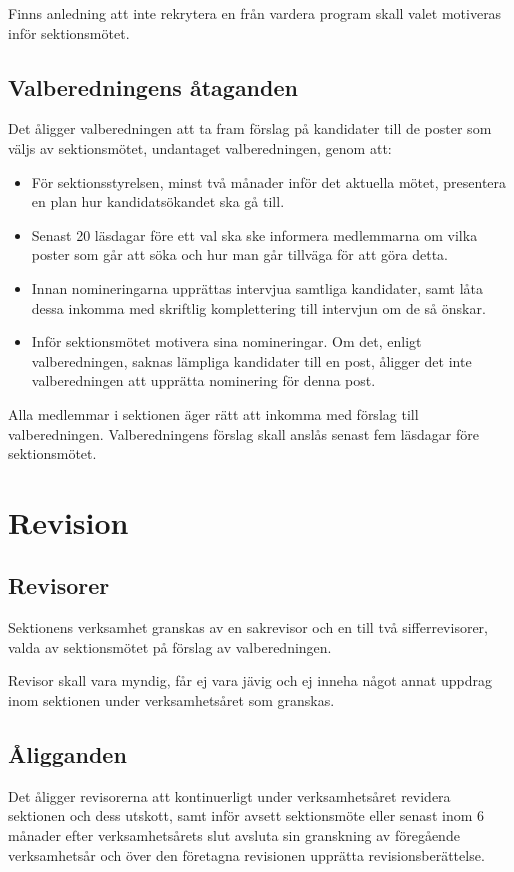 \documentclass{datateknologsektionen-document}
\begin{document}
Finns anledning att inte rekrytera en från vardera program skall valet motiveras inför sektionsmötet.

\subsection{Valberedningens åtaganden}
Det åligger valberedningen att ta fram förslag på kandidater till de poster som väljs
av sektionsmötet, undantaget valberedningen, genom att:

\begin{itemize}
  \item För sektionsstyrelsen, minst två månader inför det aktuella mötet, presentera
        en plan hur kandidatsökandet ska gå till.
  \item Senast 20 läsdagar före ett val ska ske informera medlemmarna om vilka poster
        som går att söka och hur man går tillväga för att göra detta.
  \item Innan nomineringarna upprättas intervjua samtliga kandidater, samt låta dessa
        inkomma med skriftlig komplettering till intervjun om de så önskar.
  \item Inför sektionsmötet motivera sina nomineringar. Om det, enligt valberedningen,
        saknas lämpliga kandidater till en post, åligger det inte valberedningen att
        upprätta nominering för denna post.
\end{itemize}

Alla medlemmar i sektionen äger rätt att inkomma med förslag till valberedningen.
Valberedningens förslag skall anslås senast fem läsdagar före sektionsmötet.

\section{Revision}
\subsection{Revisorer}
Sektionens verksamhet granskas av en sakrevisor och en till två sifferrevisorer, valda
av sektionsmötet på förslag av valberedningen.

Revisor skall vara myndig, får ej vara jävig och ej inneha något annat uppdrag inom sektionen
under verksamhetsåret som granskas.

\subsection{Åligganden}
Det åligger revisorerna att kontinuerligt under verksamhetsåret revidera sektionen och dess utskott,
samt inför avsett sektionsmöte eller senast inom 6 månader efter verksamhetsårets slut avsluta sin
granskning av föregående verksamhetsår och över den företagna revisionen upprätta revisionsberättelse.
\end{document}
